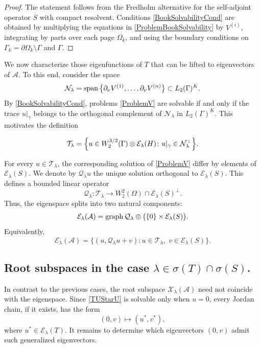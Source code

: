 \documentclass[reqno]{amsart}
\theoremstyle{definition}
\theoremstyle{remark}
\numberwithin{equation}{section}
\newcommand{\spn}{\mathop{\rm span}}
\newcommand{\graph}{\mathop{\rm graph}}
\newcommand{\cA}{\mathcal{A}}
\newcommand{\cE}{\mathcal{E}}
\newcommand{\cN}{\mathcal{N}}
\newcommand{\cT}{\mathcal{T}}
\newcommand{\cQ}{\mathcal{Q}}
\newcommand{\cX}{\mathcal{X}}
\begin{document}
\begin{proof}
The statement follows from the Fredholm alternative for the
self-adjoint operator $S$ with compact resolvent.
Conditions \eqref{BookSolvabilityCond} are obtained by multiplying
the equations in \eqref{ProblemBookSolvability} by $V^{(i)}$,
integrating by parts over each page $\Omega_k$, and using the
boundary conditions on $\Gamma_k=\partial\Omega_k\setminus\Gamma$ and $\Gamma$.
\end{proof}

We now characterize those eigenfunctions of $T$ that can be lifted to eigenvectors of $\cA$. To this end, consider the space
\begin{equation*}
\cN_\lambda=\spn\big\{\partial_\nu V^{(1)},\dots,\partial_\nu V^{(n)}\big\}\subset L_2(\Gamma)^K.
\end{equation*}
By \eqref{BookSolvabilityCond},  problems \eqref{ProblemV} are solvable if and only if the trace $u|_\gamma$ belongs to the orthogonal complement of $\cN_\lambda$ in $L_2(\Gamma)^K$. This motivates the definition

\begin{equation*}
\cT_\lambda=\Bigl\{u\in W_2^{3/2}(\Gamma)\otimes\cE_\lambda(H)\colon
u|_\gamma\in\cN_\lambda^\perp\Bigr\}.
\end{equation*}



For every $u\in\cT_\lambda$, the corresponding solution of \eqref{ProblemV} differ by elements of $\cE_\lambda(S)$. We denote by $\cQ_\lambda u$ the unique solution orthogonal to $\cE_\lambda(S)$. This defines a bounded linear operator
\begin{equation}\label{OperatorQ}
\cQ_\lambda\colon\cT_\lambda\to W_2^2(\Omega)\cap\cE_\lambda(S)^\perp.
\end{equation}
Thus, the eigenspace splits into two natural components:
\begin{equation*}
\cE_\lambda(\cA)=\graph\cQ_\lambda
\oplus
\bigl(\{0\}\times\cE_\lambda(S)\bigr).
\end{equation*}
Equivalently,
\begin{equation*}
\cE_\lambda(\cA)=\bigl\{(u,\cQ_\lambda u+v)\colon u\in\mathcal T_\lambda,\; v\in\cE_\lambda(S)\bigr\}.
\end{equation*}




\subsection{Root subspaces in the case $\lambda\in\sigma(T)\cap\sigma(S)$.}
In contrast to the previous cases, the root subspace $\cX_\lambda(\cA)$ need not coincide with the eigenspace. Since \eqref{TUStarU} is solvable only when
$u=0$, every Jordan chain, if it exists, has the form
\begin{equation}\label{Chain}
(0,v)\mapsto (u^*,v^*),
\end{equation}
where $u^*\in\cE_\lambda(T)$. It remains to determine which eigenvectors $(0,v)$ admit such generalized eigenvectors.
\end{document}
